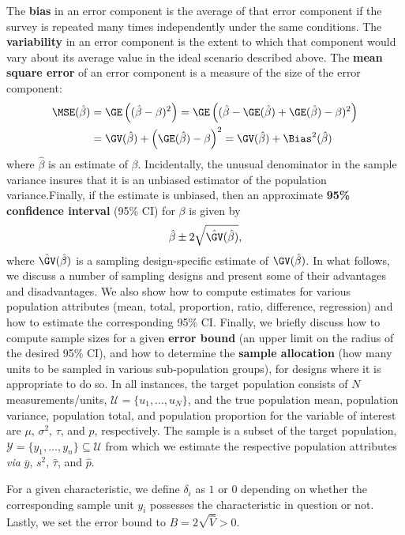 The \textbf{bias} in an error component is the average of that error component if the survey is repeated many times independently under the same conditions. The \textbf{variability} in an error component is the extent to which that component would vary about its average value in the ideal scenario described above. The \textbf{mean square error} of an error component is a measure of the size of the error component:
\begin{align*}
\MSE(\hat{\beta})&=\GE\left((\hat{\beta}-\beta)^2\right)=\GE\left((\hat{\beta}-\GE(\hat{\beta})+\GE(\hat{\beta})-\beta)^2\right)\\&=\GV(\hat{\beta})+\left(\GE(\hat{\beta})-\beta\right)^2=\GV(\hat{\beta})+\Bias^2(\hat{\beta}) \end{align*}
where $\hat{\beta}$ is an estimate of $\beta$. Incidentally, the unusual denominator in the sample variance insures that it is an unbiased estimator of the population variance.\newl Finally, if the estimate is unbiased, then an approximate \textbf{95\% confidence interval} (95\% CI) for $\beta$ is given by $$\hat{\beta}\pm 2\sqrt{\hat{\GV}(\hat{\beta})},$$ where $\hat{\GV}(\hat{\beta})$ is a sampling design-specific estimate of $\GV(\hat{\beta})$.
\newl In what follows, we discuss a number of sampling designs and present some of their advantages and disadvantages. We also show how to compute estimates for various population attributes (mean, total, proportion, ratio, difference, regression) and how to estimate the corresponding 95\% CI. Finally, we briefly discuss how to compute sample sizes for a given \textbf{error bound} (an upper limit on the radius of the desired 95\% CI), and how to determine the \textbf{sample allocation} (how many units to be sampled in various sub-population groups), for designs where it is appropriate to do so. \newl 
In all instances, the target population consists of $N$ measurements/units, $\mathcal{U}=\{u_1,\ldots,u_N\}$, and the true population mean, population variance, population total, and population proportion for the variable of interest are $\mu$, $\sigma^2$, $\tau$, and $p$, respectively. The sample is a subset of the target population, $\mathcal{Y}=\{y_1,\ldots,y_n\}\subseteq \mathcal{U}$ from which we estimate the respective population attributes \textit{via} $\overline{y}$, $s^2$, $\hat{\tau}$, and $\hat{p}$. \par For a given characteristic, we define $\delta_i$ as $1$ or $0$ depending on whether the corresponding sample unit $y_i$ possesses the characteristic in question or not. Lastly, we set the error bound to $B=2\sqrt{\hat{V}}>0$.\newpage\noindent 
